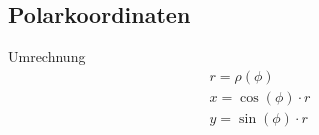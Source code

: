 \subsection{Polarkoordinaten}
    Umrechnung
    \begin{align*}
        r = \rho(\phi)\\
        x = \cos(\phi) \cdot r\\
        y = \sin(\phi) \cdot r
    \end{align*}